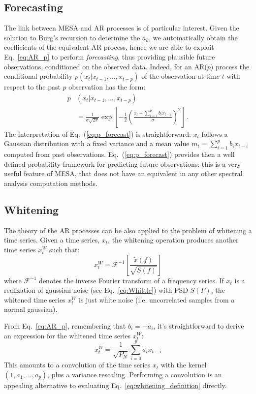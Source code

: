 \documentclass{aa}
\begin{document}
\subsection{Forecasting} \label{sec:forecasting}
The link between MESA and AR processes is of particular interest. Given the solution to Burg's recursion to determine the $a_k$, we automatically obtain the coefficients of the equivalent AR process, hence we are able to exploit Eq.~\ref{eq:AR_p} to perform \emph{forecasting}, thus providing plausible future observations, conditioned on the observed data.
Indeed, for an AR($p$) process the conditional probability $p(x_t|x_{t-1}, \ldots , x_{t-p})$ of the observation at time $t$ with respect to the past $p$ observation has the form:
\begin{align}\label{eq:p_forecast}
	p&(x_t|x_{t-1}, \ldots , x_{t-p}) \nonumber\\
	&= \frac{1}{\sigma\sqrt{2\pi}} \exp\left[-\frac{1}{2} \left(\frac{x_t - \sum_{i = 1}^p b_i x_{t-i}}{\sigma}\right)^2\right]\,.
\end{align}
The interpretation of Eq.~(\ref{eq:p_forecast}) is straightforward: $x_t$ follows a Gaussian distribution with a fixed variance and a mean value $m_t = \sum_{i = 1}^p b_i x_{t-i}$ computed from past observations.
Eq.~(\ref{eq:p_forecast}) provides then a well defined probability framework for predicting future observations: this is a very useful feature of MESA, that does not have an equivalent in any other spectral analysis computation methods.

\subsection{Whitening} \label{sec:whitening}

The theory of the AR processes can be also applied to the problem of whitening a time series.
Given a time series, $x_t$, the whitening operation produces another time series $x^W_t$ such that:
%
\begin{equation}\label{eq:whitening_definition}
	x^W_t = \mathcal{F}^{-1}\left[ \frac{\tilde{x}(f)}{\sqrt{S(f)}} \right]
\end{equation}
%
where $\mathcal{F}^{-1}$ denotes the inverse Fourier transform of a frequency series.
If $x_t$ is a realization of gaussian noise (see Eq.~\eqref{eq:Whittle}) with PSD $S(F)$, the whitened time series $x^W_t$ is just white noise (i.e. uncorrelated samples from a normal gaussian).

From Eq.~\eqref{eq:AR_p}, remembering that $b_i = - a_i$, it's straightforward to derive an expression for the whitened time series $x^W_t$:
\begin{equation}
	x^W_t = \frac{1}{\sqrt{P_N}} \sum_{i=0}^p a_i x_{t-i}
\end{equation}
This amounts to a convolution of the time series  $x_t$ with the kernel $(1, a_1, \hdots, a_p)$, plus a variance rescaling.
Performing a convolution is an appealing alternative to evaluating Eq.~\eqref{eq:whitening_definition} directly.
\end{document}
